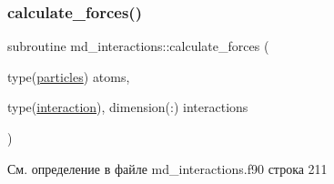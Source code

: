\subsubsection{\texorpdfstring{calculate\+\_\+forces()}{calculate\_forces()}}
{\footnotesize\ttfamily subroutine md\+\_\+interactions\+::calculate\+\_\+forces (\begin{DoxyParamCaption}\item[{type(\mbox{\hyperlink{structmd__general_1_1particles}{particles}})}]{atoms,  }\item[{type(\mbox{\hyperlink{structmd__interactions_1_1interaction}{interaction}}), dimension(\+:)}]{interactions }\end{DoxyParamCaption})}



См. определение в файле md\+\_\+interactions.\+f90 строка 211


